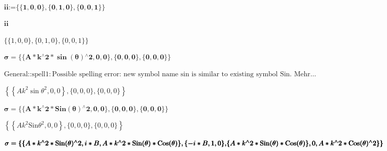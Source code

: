 \documentclass{article}
\begin{document}
\noindent\(\pmb{}\)

\noindent\(\pmb{\text{ii}\text{:=}\{\{1,0,0\},\{0,1,0\},\{0,0,1\}\}}\)

\noindent\(\pmb{\text{ii}}\)

\noindent\(\{\{1,0,0\},\{0,1,0\},\{0,0,1\}\}\)

\noindent\(\pmb{\sigma =\{\{A*k{}^{\wedge}2*\sin (\theta ){}^{\wedge}2,0,0\},\{0,0,0\},\{0,0,0\}\}}\)

\noindent\(\text{General}\text{::}\text{spell1}: \text{Possible spelling error: new symbol name sin is similar to existing symbol Sin. }\text{Mehr$\ldots $}\)

\noindent\(\left\{\left\{A k^2 \sin  \theta ^2,0,0\right\},\{0,0,0\},\{0,0,0\}\right\}\)

\noindent\(\pmb{\sigma =\{\{A*k{}^{\wedge}2*\text{Sin}(\theta ){}^{\wedge}2,0,0\},\{0,0,0\},\{0,0,0\}\}}\)

\noindent\(\left\{\left\{A k^2 \text{Sin} \theta ^2,0,0\right\},\{0,0,0\},\{0,0,0\}\right\}\)

\noindent\(\pmb{\sigma =\{\{A*k{}^{\wedge}2*\text{Sin}(\theta ){}^{\wedge}2,i*B,A*k{}^{\wedge}2*\text{Sin}(\theta )*\text{Cos}(\theta )\},\{-i*B,1,0\},}\\
\pmb{\{A*k{}^{\wedge}2*\text{Sin}(\theta )*\text{Cos}(\theta )\},0,A*k{}^{\wedge}2*\text{Cos}(\theta ){}^{\wedge}2\}\}}\)
\end{document}
